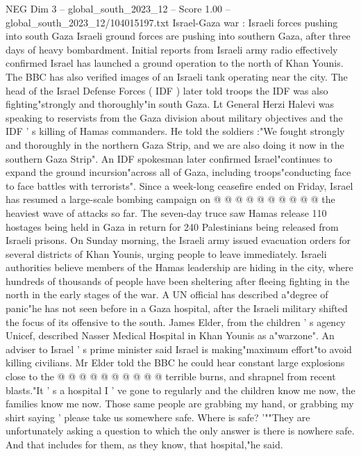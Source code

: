 \begin{textsample}{NEG Dim 3 – global\_south\_2023\_12 – Score 1.00 – global\_south\_2023\_12/104015197.txt}  \label{ex:f3_neg_017}
Israel-Gaza war : Israeli forces pushing into south Gaza Israeli ground forces are pushing into southern Gaza, after three days of heavy bombardment.
Initial reports from Israeli army radio effectively confirmed Israel has launched a ground operation to the north of Khan Younis.
The BBC has also verified images of an Israeli tank operating near the city.
The head of the Israel Defense Forces ( IDF ) later told troops the IDF was also fighting"strongly and thoroughly"in south Gaza.
Lt General Herzi Halevi was speaking to reservists from the Gaza division about military objectives and the IDF ' s killing of Hamas commanders.
He told the soldiers :"We fought strongly and thoroughly in the northern Gaza Strip, and we are also doing it now in the southern Gaza Strip".
An IDF spokesman later confirmed Israel"continues to expand the ground incursion"across all of Gaza, including troops"conducting face to face battles with terrorists".
Since a week-long ceasefire ended on Friday, Israel has resumed a large-scale bombing campaign on @ @ @ @ @ @ @ @ @ @ the heaviest wave of attacks so far.
The seven-day truce saw Hamas release 110 hostages being held in Gaza in return for 240 Palestinians being released from Israeli prisons.
On Sunday morning, the Israeli army issued evacuation orders for several districts of Khan Younis, urging people to leave immediately.
Israeli authorities believe members of the Hamas leadership are hiding in the city, where hundreds of thousands of people have been sheltering after fleeing fighting in the north in the early stages of the war.
A UN official has described a"degree of panic"he has not seen before in a Gaza hospital, after the Israeli military shifted the focus of its offensive to the south.
James Elder, from the children ' s agency Unicef, described Nasser Medical Hospital in Khan Younis as a"warzone".
An adviser to Israel ' s prime minister said Israel is making"maximum effort"to avoid killing civilians.
Mr Elder told the BBC he could hear constant large explosions close to the @ @ @ @ @ @ @ @ @ @ terrible burns, and shrapnel from recent blasts."It ' s a hospital I ' ve gone to regularly and the children know me now, the families know me now.
Those same people are grabbing my hand, or grabbing my shirt saying ' please take us somewhere safe.
Where is safe? '""They are unfortunately asking a question to which the only answer is there is nowhere safe.
And that includes for them, as they know, that hospital,"he said.

\end{textsample}
